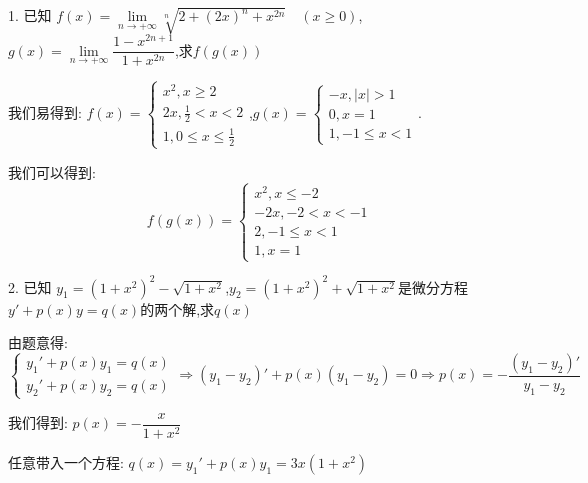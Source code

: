 1. 已知 $f(x)=\lim\limits_{n\rightarrow  +\infty}\sqrt[n]{2+(2x)^{n}+x^{2n}}\quad (x\geq 0)$,$g(x)=\lim\limits_{n\rightarrow +\infty}\dfrac{1-x^{2n+1}}{1+x^{2n}}$,求$f(g(x))$
\begin{solution}
	
	我们易得到: $f(x)=\left\lbrace 
	\begin{array}{l}
		x^2,x\geq 2\\
		2x,\frac{1}{2}<x< 2\\
		1,0\leq x\leq \frac{1}{2}
	\end{array}
	\right. $,\quad $g(x)=\left\lbrace 
	\begin{array}{l}
		-x,|x|> 1\\
		0,x=1\\
		1,-1\leq x<1
	\end{array}
	\right. $.
	
	我们可以得到: 
	$$f(g(x))=\left\lbrace 
	\begin{array}{l}
		x^2,x\leq -2\\
		-2x,-2<x<-1\\
		2,-1\leq x<1\\
		1,x=1	
	\end{array}
	\right. $$
\end{solution}


2. 已知 $y_{1}=(1+x^2)^2-\sqrt{1+x^2}$,$y_{2}=(1+x^2)^2+\sqrt{1+x^2}$是微分方程$y'+p(x)y=q(x)$的两个解,求$q(x)$
\begin{solution}
	
	由题意得: 
	$$\left\lbrace 
	\begin{array}{l}
		y_{1}'+p(x)y_{1}=q(x)\\
		y_{2}'+p(x)y_{2}=q(x)
	\end{array}
	\right. \Rightarrow (y_{1}-y_{2})'+p(x)(y_{1}-y_{2})=0\Rightarrow p(x)=-\dfrac{(y_{1}-y_{2})'}{y_{1}-y_{2}}$$
	
	我们得到: $p(x)=-\dfrac{x}{1+x^2}$
	
	任意带入一个方程: $q(x)=y_{1}'+p(x)y_{1}=3x(1+x^2)$
\end{solution}


